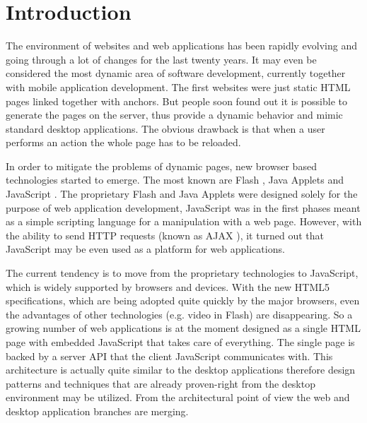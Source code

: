\documentclass[12pt,a4paper]{report}
\begin{document}
\newpage
\pagestyle{plain}
\setcounter{page}{1}
\tableofcontents



\chapter{Introduction}

The environment of websites and web applications has been rapidly evolving and going through a lot of changes for the last twenty years. It may even be considered the most dynamic area of software development, currently together with mobile application development. The first websites were just static HTML pages linked together with anchors. But people soon found out it is possible to generate the pages on the server, thus provide a dynamic behavior and mimic standard desktop applications. The obvious drawback is that when a user performs an action the whole page has to be reloaded. 

In order to mitigate the problems of dynamic pages, new browser based technologies started to emerge. The most known are Flash \cite{Flash}, Java Applets \cite{JavaApplets} and JavaScript \cite{JavaScript} \cite{EcmaScript}. The proprietary Flash and Java Applets were designed solely for the purpose of web application development, JavaScript was in the first phases meant as a simple scripting language for a manipulation with a web page. However, with the ability to send HTTP requests (known as AJAX \cite{Ajax}), it turned out that JavaScript may be even used as a platform for web applications. 

The current tendency is to move from the proprietary technologies to JavaScript, which is widely supported by browsers and devices. With the new HTML5 \cite{Html5} specifications, which are being adopted quite quickly by the major browsers, even the advantages of other technologies (e.g. video in Flash) are disappearing. So a growing number of web applications is at the moment designed as a single HTML page with embedded JavaScript that takes care of everything. The single page is backed by a server API that the client JavaScript communicates with. This architecture is actually quite similar to the desktop applications therefore design patterns and techniques that are already proven-right from the desktop environment may be utilized. From the architectural point of view the web and desktop application branches are merging.
\end{document}
